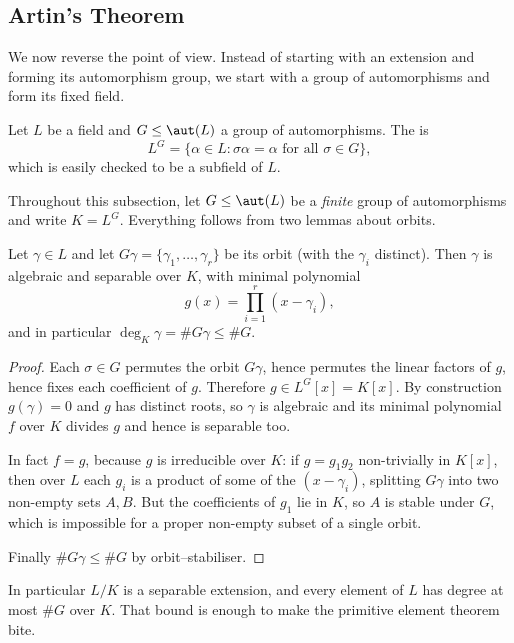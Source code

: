 \documentclass[a4paper]{scrartcl}
\begin{document}
\subsection{Artin's Theorem}

We now reverse the point of view. Instead of starting with an extension and forming its automorphism group, we start with a group of automorphisms and form its fixed field.

\begin{definition}
	Let $L$ be a field and $G \leq \aut(L)$ a group of automorphisms. The  is
	$$L^G = \{\alpha \in L : \sigma\alpha = \alpha \text{ for all } \sigma \in G\},$$
	which is easily checked to be a subfield of $L$.
\end{definition}

Throughout this subsection, let $G \leq \aut(L)$ be a \emph{finite} group of automorphisms and write $K = L^G$. Everything follows from two lemmas about orbits.

\begin{lemma}\label{lem:orbitminpoly}
	Let $\gamma \in L$ and let $G\gamma = \{\gamma_1, \dots, \gamma_r\}$ be its orbit (with the $\gamma_i$ distinct). Then $\gamma$ is algebraic and separable over $K$, with minimal polynomial
	$$g(x) = \prod_{i=1}^r (x - \gamma_i),$$
	and in particular $\deg_K \gamma = \#G\gamma \leq \#G$.
\end{lemma}

\begin{proof}
	Each $\sigma \in G$ permutes the orbit $G\gamma$, hence permutes the linear factors of $g$, hence fixes each coefficient of $g$. Therefore $g \in L^G[x] = K[x]$. By construction $g(\gamma) = 0$ and $g$ has distinct roots, so $\gamma$ is algebraic and its minimal polynomial $f$ over $K$ divides $g$ and hence is separable too.

	In fact $f = g$, because $g$ is irreducible over $K$: if $g = g_1g_2$ non-trivially in $K[x]$, then over $L$ each $g_i$ is a product of some of the $(x-\gamma_i)$, splitting $G\gamma$ into two non-empty sets $A, B$. But the coefficients of $g_1$ lie in $K$, so $A$ is stable under $G$, which is impossible for a proper non-empty subset of a single orbit.

	Finally $\#G\gamma \leq \#G$ by orbit--stabiliser.
\end{proof}

In particular $L/K$ is a separable extension, and every element of $L$ has degree at most $\#G$ over $K$. That bound is enough to make the primitive element theorem bite.
\end{document}
